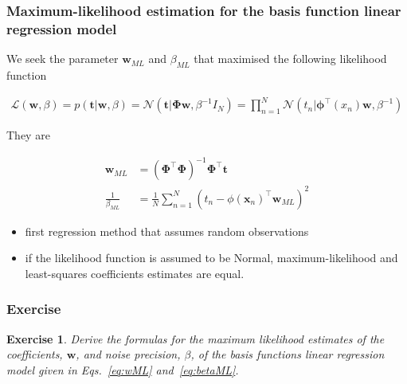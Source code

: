 \documentclass{beamer}
\newtheorem{probExercise}{Exercise}
\begin{document}
\begin{frame}
    \frametitle{Maximum-likelihood estimation for the basis function linear
    regression model}

    \footnotesize
    We seek the parameter $\mathbf{w}_{ML}$ and $\beta_{ML}$ that maximised the following likelihood function

    \begin{align}
        \mathcal{L}(\mathbf{w},\beta)=p(\mathbf{t}|\mathbf{w},\beta)=\mathcal{N}(\mathbf{t}|\boldsymbol{\Phi}\mathbf{w},\beta^{-1}I_N)=\prod_{n=1}^N\mathcal{N}(t_n|\boldsymbol{\phi}^\intercal(x_n)\mathbf{w},\beta^{-1})\label{eq:linearRegressionLikelihood}
    \end{align}

    They are

    \begin{align}
        \mathbf{w}_{ML}&=(\boldsymbol{\Phi}^\intercal\boldsymbol{\Phi})^{-1}\boldsymbol{\Phi}^\intercal\mathbf{t}\label{eq:wML}\\
        \frac{1}{\beta_{ML}}&=\frac{1}{N}\sum_{n=1}^N(t_n-\phi(\mathbf{x}_n)^\intercal\mathbf{w}_{ML})^2\label{eq:betaML}
    \end{align}

	\begin{itemize}

		\item first regression method that assumes random observations

		\item if the likelihood function is assumed to be Normal,
		maximum-likelihood and least-squares coefficients estimates are equal.

	\end{itemize}

    \normalsize

\end{frame}

\begin{frame}
    \frametitle{Exercise}

    \begin{probExercise}
        Derive the formulas for the maximum likelihood estimates of the
        coefficients, $\mathbf{w}$, and noise precision, $\beta$, of the basis
        functions linear regression model given in Eqs.~\ref{eq:wML}
        and~\ref{eq:betaML}.
    \end{probExercise}

\end{frame}
\end{document}
